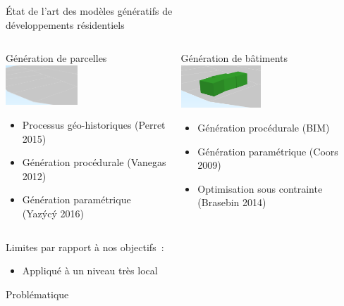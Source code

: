 \documentclass[xcolor=table]{beamer}
\begin{document}
\begin{frame}{État de l'art des modèles génératifs de \\développements résidentiels}
	\begin{columns}
		\begin{column}{0.5\textwidth}
			Génération de parcelles
			\\
			\includegraphics[width=2.7cm]{Images/parcel.png}
			\begin{itemize}
				\small
				\item Processus géo-historiques (Perret 2015)
				\item Génération procédurale (Vanegas 2012) 
				\item Génération paramétrique (Yazýcý 2016) 
			\end{itemize}
		\end{column}
	\begin{column}{0.5\textwidth}
			Génération de bâtiments
			\\
			\includegraphics[width=3cm]{Images/bat.png}
		\begin{itemize}
			\small
			\item Génération procédurale (BIM) 
			\item Génération paramétrique (Coors 2009)
			\item Optimisation sous contrainte (Brasebin 2014)
		\end{itemize}
	\end{column}
	\end{columns}
	\vspace{0.2cm}
	Limites par rapport à nos objectifs~:
	\begin{itemize}
		\item Appliqué à un niveau très local %
	\end{itemize}
\end{frame}

\begin{frame}{Problématique}
\end{frame}
\end{document}

